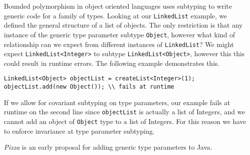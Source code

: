 \documentclass[11pt
              , a4paper
              , twoside
              , openright
              ]{report}
\begin{document}
Bounded polymorphism in object oriented languages uses subtyping to write generic code for a family of types. Looking at our \verb|LinkedList| example, we defined the general structure of a list of objects. The only restriction is that any instance of the generic type parameter subtype \verb|Object|, however what kind of relationship can we expect from different instances of \verb|LinkedList|? We might expect \verb|LinkedList<Integer>| to subtype \verb|LinkedList<Object>|, however this this could result in runtime errors. The following example demonstrates this.
\begin{lstlisting}[mathescape, style=custom_lang]
LinkedList<Object> objectList = createList<Integer>(1);
objectList.add(new Object()); \\ fails at runtime
\end{lstlisting}
If we allow for covariant subtyping on type parameters, our example fails at runtime on the second line since \verb|objectList| is actually a list of Integers, and we cannot add an object of \verb|Object| type to a list of Integers. For this reason we have to enforce invariance at type parameter subtyping.

\emph{Pizza} is an early proposal for adding generic type parameters to Java.
\end{document}
